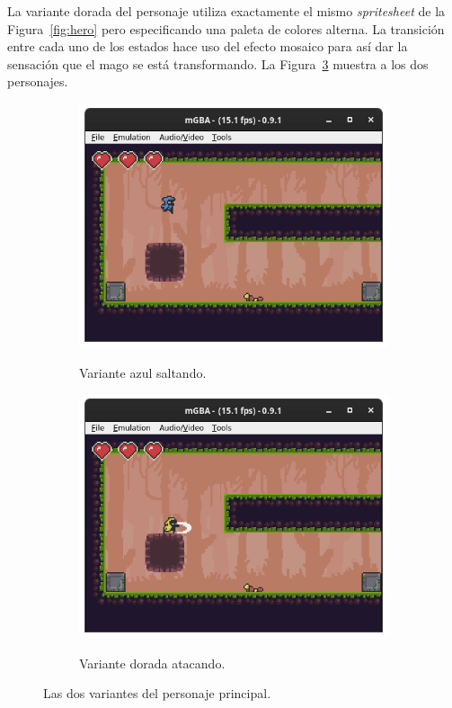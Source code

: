 La variante dorada del personaje utiliza exactamente el mismo \textit{spritesheet} de la Figura~\ref{fig:hero} pero especificando una paleta de colores alterna. La transición entre cada uno de los estados hace uso del efecto mosaico para así dar la sensación que el mago se está transformando. La Figura~\ref{fig:hero_variants} muestra a los dos personajes.


\begin{figure}[h]
	\centering
	\begin{subfigure}[b]{0.45\textwidth}
		\centering
		\includegraphics[width=\textwidth]{capitulos/capitulo6/hero_blue.png}
		\label{fig:hero_blue}
		\caption{Variante azul saltando.}
	\end{subfigure}
	\hfill
	\begin{subfigure}[b]{0.45\textwidth}
		\centering
		\includegraphics[width=\textwidth]{capitulos/capitulo6/hero_gold.png}
		\label{fig:hero_gold}
		\caption{Variante dorada atacando.}
	\end{subfigure}
	\caption{Las dos variantes del personaje principal.}
	\label{fig:hero_variants}
\end{figure}
\FloatBarrier{}

